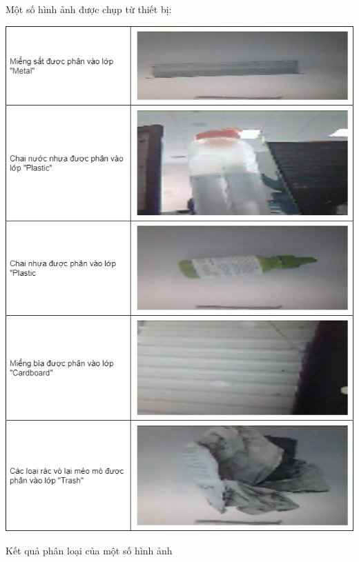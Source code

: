 Một số hình ảnh được chụp từ thiết bị:
\begin{table}[H]
    \centering
    \includegraphics[width=\linewidth]{images/Quanh/Trash Result.png}
    \caption{Kết quả phân loại của một số hình ảnh}
    \label{fig:trash_result}
\end{table}

